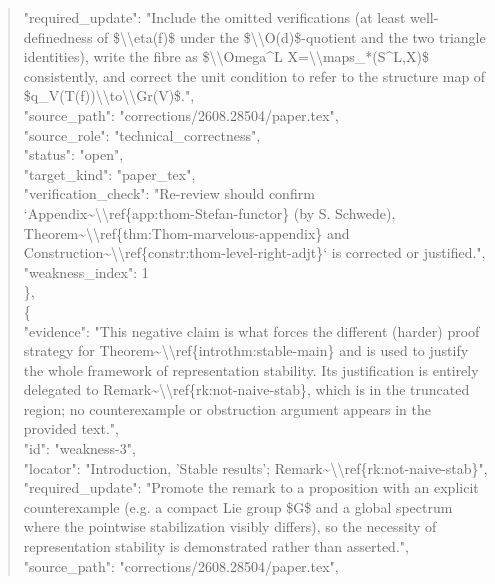 \documentclass[11pt]{article}
\begin{document}
\begin{quote}
      "required\_update": "Include the omitted verifications (at least well-definedness of \$\textbackslash{}\textbackslash{}eta(f)\$ under the \$\textbackslash{}\textbackslash{}O(d)\$-quotient and the two triangle identities), write the fibre as \$\textbackslash{}\textbackslash{}Omega\^{}L X=\textbackslash{}\textbackslash{}maps\_*(S\^{}L,X)\$ consistently, and correct the unit condition to refer to the structure map of \$q\_V(T(f))\textbackslash{}\textbackslash{}to\textbackslash{}\textbackslash{}Gr(V)\$.",\\
      "source\_path": "corrections/2608.28504/paper.tex",\\
      "source\_role": "technical\_correctness",\\
      "status": "open",\\
      "target\_kind": "paper\_tex",\\
      "verification\_check": "Re-review should confirm `Appendix\~{}\textbackslash{}\textbackslash{}ref\{app:thom-Stefan-functor\} (by S. Schwede), Theorem\~{}\textbackslash{}\textbackslash{}ref\{thm:Thom-marvelous-appendix\} and Construction\~{}\textbackslash{}\textbackslash{}ref\{constr:thom-level-right-adjt\}` is corrected or justified.",\\
      "weakness\_index": 1\\
    \},\\
    \{\\
      "evidence": "This negative claim is what forces the different (harder) proof strategy for Theorem\~{}\textbackslash{}\textbackslash{}ref\{introthm:stable-main\} and is used to justify the whole framework of representation stability. Its justification is entirely delegated to Remark\~{}\textbackslash{}\textbackslash{}ref\{rk:not-naive-stab\}, which is in the truncated region; no counterexample or obstruction argument appears in the provided text.",\\
      "id": "weakness-3",\\
      "locator": "Introduction, 'Stable results'; Remark\~{}\textbackslash{}\textbackslash{}ref\{rk:not-naive-stab\}",\\
      "required\_update": "Promote the remark to a proposition with an explicit counterexample (e.g. a compact Lie group \$G\$ and a global spectrum where the pointwise stabilization visibly differs), so the necessity of representation stability is demonstrated rather than asserted.",\\
      "source\_path": "corrections/2608.28504/paper.tex",\\

\end{quote}
\end{document}
